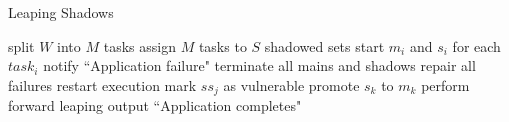\begin{algorithm}[t]
  \caption{Leaping Shadows}
  \BlankLine
  split $W$ into $M$ tasks\;  
  assign $M$ tasks to $S$ shadowed sets\;  
  start $m_i$ and $s_i$ for each $task_i$\;
    {
        {
            {
                notify ``Application failure"\;
                terminate all mains and shadows\;
                repair all failures\;
                restart execution\; %
            }
            {
                mark $ss_j$ as vulnerable\;
                {
                    promote $s_k$ to $m_k$\;
                    perform forward leaping\; %
                }
            }
        }  
    }
    output ``Application completes"\;
  \label{al:ls}
\end{algorithm}

